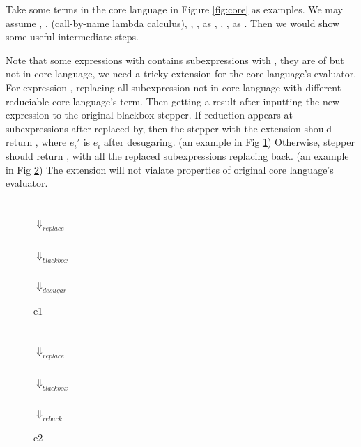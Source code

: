 Take some terms in the core language in Figure \ref{fig:core} as examples.
We may assume , ,  (call-by-name lambda calculus), , ,  as , , \m{$\lambda$},  as . Then we would show some useful intermediate steps.

Note that some expressions with  contains subexpressions with , they are of  but not in core language, we need a tricky extension for the core language's evaluator. For expression , replacing all subexpression not in core language with different reduciable core language's term. Then getting a result after inputting the new expression  to the original blackbox stepper. If reduction appears at subexpressions after  replaced by, then the stepper with the extension should return , where $e_i'$ is $e_i$ after desugaring. (an  example in Fig \ref{fig:e1}) Otherwise, stepper should return , with all the replaced subexpressions replacing back. (an example in Fig \ref{fig:e2}) The extension will not vialate properties of original core language's evaluator.

\begin{center}
\begin{figure}[h]
\centering
{}\\ $\Downarrow_{replace}$\\ \\ $\Downarrow_{blackbox}$\\ \\ $\Downarrow_{desugar}$\\ 
\caption{e1}
\label{fig:e1}
\end{figure}

\begin{figure}[h]
\centering
{}\\ $\Downarrow_{replace}$ \\\\ $\Downarrow_{blackbox}$\\  \\ $\Downarrow_{reback}$\\ 
\caption{e2}
\label{fig:e2}
\end{figure}



\end{center}

